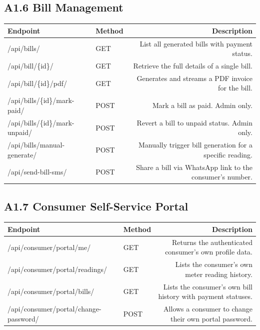 \documentclass[12pt, a4paper, onecolumn]{report}
\begin{document}
\vspace{0.8em}
\subsection*{A1.6 Bill Management}
\renewcommand{\arraystretch}{1.6}
\begin{tabularx}{\textwidth}{|E|M|D|}
\hline
\textbf{Endpoint} & \textbf{Method} & \textbf{Description} \\
\hline
/api/bills/ & GET & List all generated bills with payment status. \\
\hline
/api/bill/\{id\}/ & GET & Retrieve the full details of a single bill. \\
\hline
/api/bill/\{id\}/pdf/ & GET & Generates and streams a PDF invoice for the bill. \\
\hline
/api/bills/\{id\}/mark-paid/ & POST & Mark a bill as paid. Admin only. \\
\hline
/api/bills/\{id\}/mark-unpaid/ & POST & Revert a bill to unpaid status. Admin only. \\
\hline
/api/bills/manual-generate/ & POST & Manually trigger bill generation for a specific reading. \\
\hline
/api/send-bill-sms/ & POST & Share a bill via WhatsApp link to the consumer's number. \\
\hline
\end{tabularx}
\renewcommand{\arraystretch}{1}

\vspace{0.8em}
\subsection*{A1.7 Consumer Self-Service Portal}
\renewcommand{\arraystretch}{1.6}
\begin{tabularx}{\textwidth}{|E|M|D|}
\hline
\textbf{Endpoint} & \textbf{Method} & \textbf{Description} \\
\hline
/api/consumer/portal/me/ & GET & Returns the authenticated consumer's own profile data. \\
\hline
/api/consumer/portal/readings/ & GET & Lists the consumer's own meter reading history. \\
\hline
/api/consumer/portal/bills/ & GET & Lists the consumer's own bill history with payment statuses. \\
\hline
/api/consumer/portal/change-password/ & POST & Allows a consumer to change their own portal password. \\
\hline
\end{tabularx}
\renewcommand{\arraystretch}{1}
\end{document}
